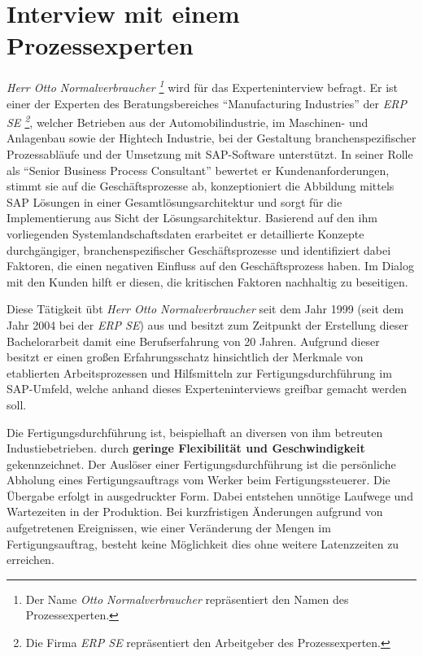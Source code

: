 \tocless\section{Interview mit einem Prozessexperten}\label{ah:interviewCON}

\textit{Herr Otto Normalverbraucher \footnote{Der Name \textit{Otto Normalverbraucher} repräsentiert den Namen des Prozessexperten.}} wird für das Experteninterview befragt.
Er ist einer der Experten des Beratungsbereiches \enquote{Manufacturing Industries} der \textit{ERP SE \footnote{Die Firma \textit{ERP SE} repräsentiert den Arbeitgeber des Prozessexperten.}}, welcher Betrieben aus der Automobilindustrie, im Maschinen- und Anlagenbau sowie der Hightech Industrie, bei der Gestaltung branchenspezifischer Prozessabläufe und der Umsetzung mit SAP-Software unterstützt.
In seiner Rolle als \enquote{Senior Business Process Consultant} bewertet er Kundenanforderungen, stimmt sie auf die Geschäftsprozesse ab, konzeptioniert die Abbildung mittels SAP Lösungen in einer Gesamtlösungsarchitektur und sorgt für die Implementierung aus Sicht der Lösungsarchitektur.
Basierend auf den ihm vorliegenden Systemlandschaftsdaten erarbeitet er detaillierte Konzepte durchgängiger, branchenspezifischer Geschäftsprozesse und identifiziert dabei Faktoren, die einen negativen Einfluss auf den Geschäftsprozess haben.
Im Dialog mit den Kunden hilft er diesen, die kritischen Faktoren nachhaltig zu beseitigen. 
 
Diese Tätigkeit übt \textit{Herr Otto Normalverbraucher} seit dem Jahr 1999 (seit dem Jahr 2004 bei der \textit{ERP SE}) aus und besitzt zum Zeitpunkt der Erstellung dieser Bachelorarbeit damit eine Berufserfahrung von 20 Jahren.
Aufgrund dieser besitzt er einen großen Erfahrungsschatz hinsichtlich der Merkmale von etablierten Arbeitsprozessen und Hilfsmitteln zur Fertigungsdurchführung im SAP-Umfeld, welche anhand dieses Experteninterviews greifbar gemacht werden soll.


\begin{definitionForm}[KA-P-1]
Die Fertigungsdurchführung ist, beispielhaft an diversen von ihm betreuten Industiebetrieben. durch \textbf{geringe Flexibilität und Geschwindigkeit} gekennzeichnet. Der Auslöser einer Fertigungsdurchführung ist die persönliche Abholung eines Fertigungsauftrags vom Werker beim Fertigungssteuerer. Die Übergabe erfolgt in ausgedruckter Form. Dabei entstehen unnötige Laufwege und Wartezeiten in der Produktion. Bei kurzfristigen Änderungen aufgrund von aufgetretenen Ereignissen, wie einer Veränderung der Mengen im Fertigungsauftrag, besteht keine Möglichkeit dies ohne weitere Latenzzeiten zu erreichen.
\end{definitionForm}

